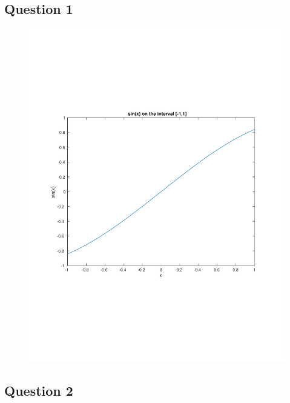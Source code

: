 \subsection{Question 1}



\begin{figure}[h]
\centering
\includegraphics[trim = 20mm 20mm 20mm 20mm, clip, width=.65\textwidth]{figs/a0_q1.pdf}
\label{fig:a0_q1}
\end{figure}

\newpage
\subsection{Question 2}



